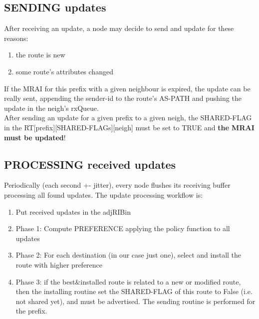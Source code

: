 \documentclass[fleqn,10pt]{SelfArx} %
\begin{document}
\subsection*{SENDING updates}
After receiving an update, a node may decide to send and update for these reasons:
\begin{enumerate}[noitemsep]
  \item the route is new
  \item some route's attributes changed
\end{enumerate}
If the MRAI for this prefix with a given neighbour is expired, the update can be really sent, appending the sender-id to the route's AS-PATH and pushing the update in the neigh's rxQueue.\\
After sending an update for a given prefix to a given neigh, the SHARED-FLAG in the RT[prefix][SHARED-FLAGs][neigh] must be set to TRUE and \textbf{the MRAI must be updated}!

\subsection*{PROCESSING received updates}
Periodically (each second +- jitter), every node flushes its receiving buffer processing all found updates. The update processing workflow is:
\begin{enumerate}[noitemsep]
  \item Put received updates in the adjRIBin
  \item Phase 1: Compute PREFERENCE applying the policy function to all updates 
  \item Phase 2: For each destination (in our case just one), select and install the route with higher preference
  \item Phase 3: if the best\&installed route is related to a new or modified route, then the installing routine set the SHARED-FLAG of this route to False (i.e. not shared yet), and must be advertised. The sending routine is performed for the prefix.
\end{enumerate}











\end{document}
